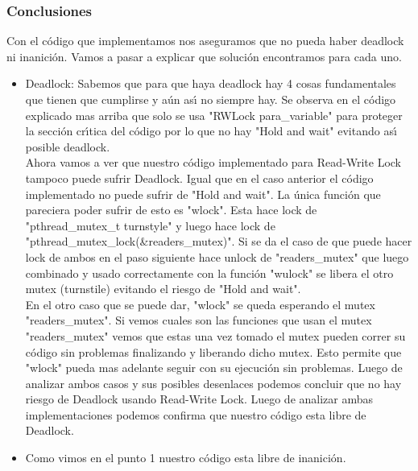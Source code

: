 \subsubsection{Conclusiones}

Con el c\'{o}digo que implementamos nos aseguramos que no pueda haber deadlock ni inanici\'{o}n. Vamos a pasar a explicar que 
soluci\'{o}n encontramos para cada uno. \\

\begin{itemize}
 \item Deadlock: Sabemos que para que haya deadlock hay 4 cosas fundamentales que tienen que cumplirse y a\'{u}n as\'{\i} no 
 siempre hay. Se observa en el c\'{o}digo explicado mas arriba que solo se usa "RWLock para\_variable" para proteger la secci\'{o}n 
 cr\'{\i}tica del c\'{o}digo por lo que no hay "Hold and wait" evitando as\'{\i} posible deadlock.\\
 Ahora vamos a ver que nuestro c\'{o}digo implementado para Read-Write Lock tampoco puede sufrir Deadlock. Igual que en el caso 
 anterior el c\'{o}digo implementado no puede sufrir de "Hold and wait". La \'{u}nica funci\'{o}n que pareciera poder sufrir de 
 esto es "wlock". Esta hace lock de "pthread\_mutex\_t turnstyle" y luego hace lock de "pthread\_mutex\_lock(\&readers\_mutex)". Si se 
 da el caso de que puede hacer lock de ambos en el paso siguiente hace unlock de "readers\_mutex" que luego combinado y usado 
 correctamente con la funci\'{o}n "wulock" se libera el otro mutex (turnstile) evitando el riesgo de "Hold and wait". \\
 En el otro caso que se puede dar, "wlock" se queda esperando el mutex "readers\_mutex". Si vemos cuales son las funciones que 
 usan el mutex "readers\_mutex" vemos que estas una vez tomado el mutex pueden correr su c\'{o}digo sin problemas finalizando 
 y liberando dicho mutex. Esto permite que "wlock" pueda mas adelante seguir con su ejecuci\'{o}n sin problemas. Luego de 
 analizar ambos casos y sus posibles desenlaces podemos concluir que no hay riesgo de Deadlock usando Read-Write Lock. Luego de 
 analizar ambas implementaciones podemos confirma que nuestro c\'{o}digo esta libre de Deadlock.
 \item Como vimos en el punto 1 nuestro c\'{o}digo esta libre de inanici\'{o}n.
 \end{itemize}